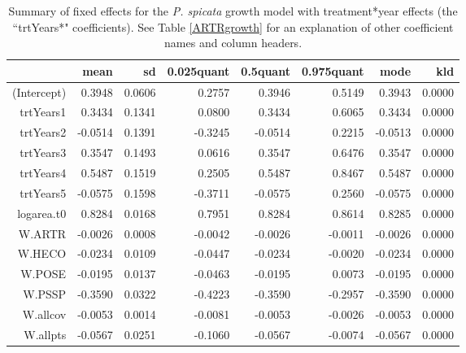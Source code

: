\documentclass[11pt]{article}
\begin{document}
\begin{table}
\centering
\caption{Summary of fixed effects for the \textit{P. spicata} growth model with treatment*year effects (the ``trtYears*" coefficients). See Table \ref{ARTRgrowth} for an explanation of other coefficient names and column headers.} 
\label{table:PSSPgrowth-trtYears}
\begin{tabular}{rrrrrrrr}
  \hline
 & mean & sd & 0.025quant & 0.5quant & 0.975quant & mode & kld \\ 
  \hline
(Intercept) & 0.3948 & 0.0606 & 0.2757 & 0.3946 & 0.5149 & 0.3943 & 0.0000 \\ 
  trtYears1 & 0.3434 & 0.1341 & 0.0800 & 0.3434 & 0.6065 & 0.3434 & 0.0000 \\ 
  trtYears2 & -0.0514 & 0.1391 & -0.3245 & -0.0514 & 0.2215 & -0.0513 & 0.0000 \\ 
  trtYears3 & 0.3547 & 0.1493 & 0.0616 & 0.3547 & 0.6476 & 0.3547 & 0.0000 \\ 
  trtYears4 & 0.5487 & 0.1519 & 0.2505 & 0.5487 & 0.8467 & 0.5487 & 0.0000 \\ 
  trtYears5 & -0.0575 & 0.1598 & -0.3711 & -0.0575 & 0.2560 & -0.0575 & 0.0000 \\ 
  logarea.t0 & 0.8284 & 0.0168 & 0.7951 & 0.8284 & 0.8614 & 0.8285 & 0.0000 \\ 
  W.ARTR & -0.0026 & 0.0008 & -0.0042 & -0.0026 & -0.0011 & -0.0026 & 0.0000 \\ 
  W.HECO & -0.0234 & 0.0109 & -0.0447 & -0.0234 & -0.0020 & -0.0234 & 0.0000 \\ 
  W.POSE & -0.0195 & 0.0137 & -0.0463 & -0.0195 & 0.0073 & -0.0195 & 0.0000 \\ 
  W.PSSP & -0.3590 & 0.0322 & -0.4223 & -0.3590 & -0.2957 & -0.3590 & 0.0000 \\ 
  W.allcov & -0.0053 & 0.0014 & -0.0081 & -0.0053 & -0.0026 & -0.0053 & 0.0000 \\ 
  W.allpts & -0.0567 & 0.0251 & -0.1060 & -0.0567 & -0.0074 & -0.0567 & 0.0000 \\ 
   \hline
\end{tabular}
\end{table}
\end{document}
